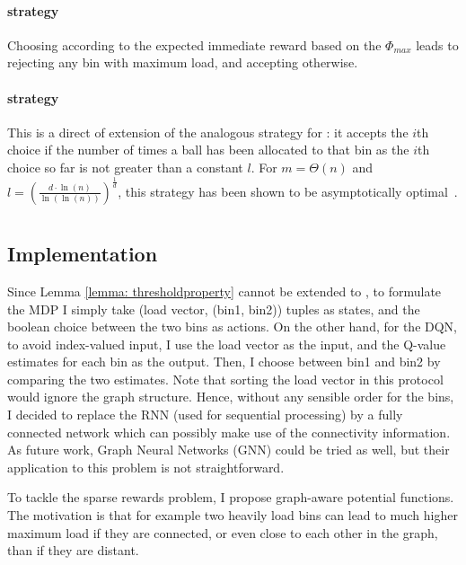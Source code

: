 \paragraph{\LocalRewardOptimiser strategy} Choosing according to the expected immediate reward based on the $\Phi_{max}$ leads to rejecting any bin with maximum load, and accepting otherwise.


\paragraph{\Threshold strategy} This is a direct of extension of the analogous strategy for \TwoThinning: it accepts the $i$th choice if the number of times a ball has been allocated to that bin as the $i$th choice so far is not greater than a constant $l$. For $m=\Theta(n)$ and $l=\left(\frac{d\cdot\ln(n)}{\ln(\ln(n))}\right)^{\frac{1}{d}}$, this strategy has been shown to be asymptotically optimal~\cite{feldheim2020dthinning}.


\section{\GraphicalTwoChoice}


\subsection{\DQL Implementation} \label{dqn-implmentation-graphical-two-choice}

Since Lemma \ref{lemma: thresholdproperty} cannot be extended to \GraphicalTwoChoice, to formulate the MDP I simply take (load vector, (bin1, bin2)) tuples as states, and the boolean choice between the two bins as actions. On the other hand, for the DQN, to avoid index-valued input, I use the load vector as the input, and the Q-value estimates for each bin as the output. Then, I choose between bin1 and bin2 by comparing the two estimates. Note that sorting the load vector in this protocol would ignore the graph structure. Hence, without any sensible order for the bins, I decided to replace the RNN (used for sequential processing) by a fully connected network which can possibly make use of the connectivity information. As future work, Graph Neural Networks (GNN) \cite{scarselli2009GNN} could be tried as well, but their application to this problem is not straightforward.



To tackle the sparse rewards problem, I propose graph-aware potential functions. The motivation is that for example two heavily load bins can lead to much higher maximum load if they are connected, or even close to each other in the graph, than if they are distant.


